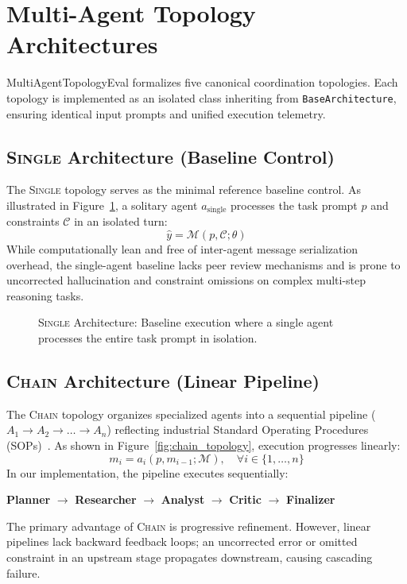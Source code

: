\section{Multi-Agent Topology Architectures}
\label{sec:topologies}

MultiAgentTopologyEval formalizes five canonical coordination topologies. Each topology is implemented as an isolated class inheriting from \texttt{BaseArchitecture}, ensuring identical input prompts and unified execution telemetry.

\subsection{\textsc{Single} Architecture (Baseline Control)}
The \textsc{Single} topology serves as the minimal reference baseline control. As illustrated in Figure~\ref{fig:single_topology}, a solitary agent $a_{\text{single}}$ processes the task prompt $p$ and constraints $\mathcal{C}$ in an isolated turn:
\begin{equation}
\hat{y} = \mathcal{M}(p, \mathcal{C}; \theta)
\end{equation}
While computationally lean and free of inter-agent message serialization overhead, the single-agent baseline lacks peer review mechanisms and is prone to uncorrected hallucination and constraint omissions on complex multi-step reasoning tasks.

\begin{figure}[h]
\centering

\caption{\textsc{Single} Architecture: Baseline execution where a single agent processes the entire task prompt in isolation.}
\label{fig:single_topology}
\end{figure}

\subsection{\textsc{Chain} Architecture (Linear Pipeline)}
The \textsc{Chain} topology organizes specialized agents into a sequential pipeline ($A_1 \rightarrow A_2 \rightarrow \dots \rightarrow A_n$) reflecting industrial Standard Operating Procedures (SOPs)~\cite{Hong2024MetaGPT}. As shown in Figure~\ref{fig:chain_topology}, execution progresses linearly:
\begin{equation}
m_{i} = a_i\left(p, m_{i-1}; \mathcal{M}\right), \quad \forall i \in \{1, \dots, n\}
\end{equation}
In our implementation, the pipeline executes sequentially:
\begin{center}
\textbf{Planner} $\longrightarrow$ \textbf{Researcher} $\longrightarrow$ \textbf{Analyst} $\longrightarrow$ \textbf{Critic} $\longrightarrow$ \textbf{Finalizer}
\end{center}
The primary advantage of \textsc{Chain} is progressive refinement. However, linear pipelines lack backward feedback loops; an uncorrected error or omitted constraint in an upstream stage propagates downstream, causing cascading failure.

